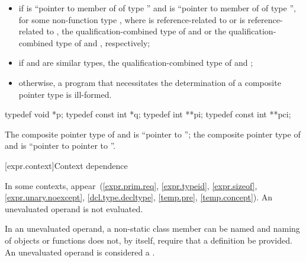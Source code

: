 \begin{itemize}
\item
if  is
``pointer to member of  of type  '' and
 is
``pointer to member of  of type  '',
for some non-function type ,
where  is
reference-related to  or  is reference-related to
, the qualification-combined type of  and  or the qualification-combined type
of  and , respectively;

\item
if  and  are similar types, the qualification-combined type of  and
;

\item
otherwise, a program that necessitates the determination of a
composite pointer type is ill-formed.
\end{itemize}

\begin{example}
\begin{codeblock}
typedef void *p;
typedef const int *q;
typedef int **pi;
typedef const int **pci;
\end{codeblock}

The composite pointer type of  and  is ``pointer to ''; the
composite pointer type of  and  is ``pointer to  pointer to
''.
\end{example}

[expr.context]{Context dependence}

\pnum
In some contexts, 
appear~(\ref{expr.prim.req},
\ref{expr.typeid},
\ref{expr.sizeof},
\ref{expr.unary.noexcept},
\ref{dcl.type.decltype},
\ref{temp.pre},
\ref{temp.concept}).
An unevaluated operand is not evaluated.
\begin{note}
In an unevaluated operand, a non-static class member can be
named and naming of objects or functions does not, by
itself, require that a definition be provided.
An unevaluated operand is considered a .
\end{note}

